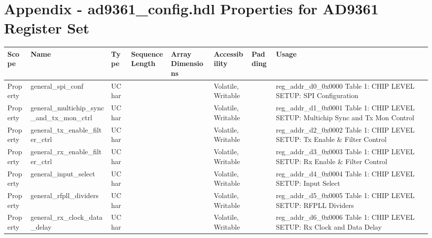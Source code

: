 \documentclass{article}
\def\comp{ad9361\_config}
\begin{document}
\section{Appendix - \comp{}.hdl Properties for AD9361 Register Set}
\label{appendix1}
  \begin{scriptsize}
    \begin{longtable}{|p{2cm}|p{5cm}|p{1cm}|p{2cm}|p{2cm}|p{1.75cm}|p{1.5cm}|p{5.1cm}|}
      \hline
      \rowcolor{blue}
  Scope    & Name                                                     & Type  & Sequence Length  & Array Dimensions & Accessibility       & Padding & Usage \\
  \hline
  Property & general\_spi\_conf                                       & UChar &                  &                  & Volatile,  Writable &         & reg\_addr\_d0\_0x0000   Table 1:  CHIP LEVEL SETUP: SPI Configuration \\
  \hline
  Property & general\_multichip\_sync\_and\_tx\_mon\_ctrl             & UChar &                  &                  & Volatile,  Writable &         & reg\_addr\_d1\_0x0001   Table 1:  CHIP LEVEL SETUP: Multichip Sync and Tx Mon Control \\
  \hline
  Property & general\_tx\_enable\_filter\_ctrl                        & UChar &                  &                  & Volatile,  Writable &         & reg\_addr\_d2\_0x0002   Table 1:  CHIP LEVEL SETUP: Tx Enable \& Filter Control \\
  \hline
  Property & general\_rx\_enable\_filter\_ctrl                        & UChar &                  &                  & Volatile,  Writable &         & reg\_addr\_d3\_0x0003   Table 1:  CHIP LEVEL SETUP: Rx Enable \& Filter Control \\
  \hline
  Property & general\_input\_select                                   & UChar &                  &                  & Volatile,  Writable &         & reg\_addr\_d4\_0x0004   Table 1:  CHIP LEVEL SETUP: Input Select \\
  \hline
  Property & general\_rfpll\_dividers                                 & UChar &                  &                  & Volatile,  Writable &         & reg\_addr\_d5\_0x0005   Table 1:  CHIP LEVEL SETUP: RFPLL Dividers \\
  \hline
  Property & general\_rx\_clock\_data\_delay                          & UChar &                  &                  & Volatile,  Writable &         & reg\_addr\_d6\_0x0006   Table 1:  CHIP LEVEL SETUP: Rx Clock and Data  Delay \\

\end{longtable}
\end{scriptsize}
\end{document}
